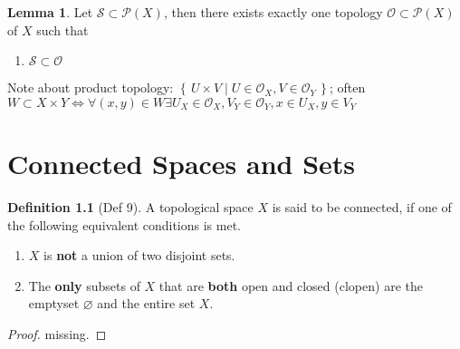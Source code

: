 \documentclass[a4paper]{book}
\theoremstyle{definition}
\newtheorem{definition}{Definition}[chapter]
\newtheorem{lemma}{Lemma}[definition]
\newcommand{\makeset}[2]{\left\{\, #1 \mid #2 \,\right\}}
\begin{document}
    \begin{lemma}
        Let \(\mathcal{S} \subset \mathcal{P}(X)\), then there exists exactly one topology \(\mathcal{O} \subset \mathcal{P}(X)\) of \(X\) such that
        \begin{enumerate}
            \item \(\mathcal{S} \subset \mathcal{O}\)
        \end{enumerate}
    \end{lemma}
    Note about product topology: \(\makeset{U \times V}{U \in \mathcal{O}_X, V \in \mathcal{O}_Y}\); often \(W \subset X \times Y \iff \forall (x, y) \in W \exists U_X \in \mathcal{O}_X, V_Y \in \mathcal{O}_Y, x \in U_X, y \in V_Y\)

    \chapter{Connected Spaces and Sets}
    \begin{defbox}
        \begin{definition}[Def 9]
            A {\color{mathif}topological space} \(X\) is said to be {\color{maththen}connected}, if one of the following {\color{mathrem}equivalent} conditions is met.
            \begin{enumerate}
                \item \(X\) is \textbf{not} a {\color{mathif}union} of two {\color{mathif}disjoint} sets.
                \item The \textbf{only} {\color{mathif}subsets} of \(X\) that are \textbf{both} {\color{mathif}open} and {\color{mathif}closed} ({\color{mathrem}clopen}) are the emptyset \(\varnothing\) and the entire set \(X\).
            \end{enumerate}
        \end{definition}
    \end{defbox}
    \begin{proof}
        missing.
    \end{proof}
\end{document}
